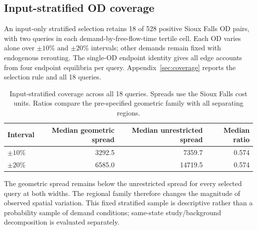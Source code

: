 \subsection{Input-stratified OD coverage}\label{sec:coverage_main}
An input-only stratified selection retains 18 of 528 positive Sioux Falls OD pairs, with two queries in each demand-by-free-flow-time tertile cell. Each OD varies alone over $\pm10\%$ and $\pm20\%$ intervals; other demands remain fixed with endogenous rerouting. The single-OD endpoint identity gives all edge accounts from four endpoint equilibria per query. Appendix~\ref{sec:coverage} reports the selection rule and all 18 queries.
\begin{table}[t]\centering\small
\caption{Input-stratified coverage across all 18 queries. Spreads use the Sioux Falls cost units. Ratios compare the pre-specified geometric family with all separating regions.}\label{tab:coverage_summary}
\begin{tabular}{lrrr}\toprule
Interval & Median geometric spread & Median unrestricted spread & Median ratio\\\midrule
$\pm10\%$ & 3292.5 & 7359.7 & 0.574\\
$\pm20\%$ & 6585.0 & 14719.5 & 0.574\\
\bottomrule\end{tabular}\end{table}
The geometric spread remains below the unrestricted spread for every selected query at both widths. The regional family therefore changes the magnitude of observed spatial variation. This fixed stratified sample is descriptive rather than a probability sample of demand conditions; same-state study/background decomposition is evaluated separately.
